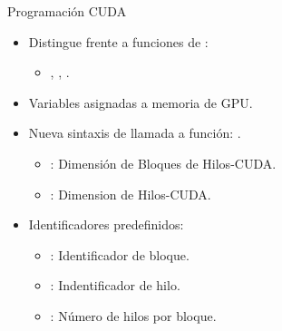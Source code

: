 \begin{frame}[t]{Programación CUDA}
\begin{itemize}
  \item Distingue  frente a funciones de :
    \begin{itemize}
      \item {}, , .
    \end{itemize}

  \item Variables  asignadas a memoria de GPU.

  \item Nueva sintaxis de llamada a función: .
    \begin{itemize}
      \item {}: Dimensión de Bloques de Hilos-CUDA.
      \item {}: Dimension de Hilos-CUDA.
    \end{itemize}

  \item Identificadores predefinidos:
    \begin{itemize}
      \item {}: Identificador de bloque.
      \item {}: Indentificador de hilo.
      \item {}: Número de hilos por bloque.
    \end{itemize}
  
\end{itemize}
\end{frame}

